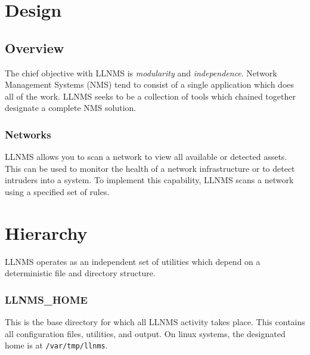 \documentclass[12pt]{report}
\begin{document}
\section*{Design}

\subsection*{Overview}
The chief objective with LLNMS is \emph{modularity} and
\emph{independence}.  Network Management Systems (NMS) tend
to consist of a single application which does all of the work.  
LLNMS seeks to be a collection of tools which chained together 
designate a complete NMS solution. 


\subsubsection*{Networks}

LLNMS allows you to scan a network to view all available or detected assets.  This 
can be used to monitor the health of a network infrastructure or to detect intruders into
a system.  To implement this capability, LLNMS scans a network using a specified set of 
rules.  

\section*{Hierarchy}

LLNMS operates as an independent set of utilities which depend on 
a deterministic file and directory structure. 

\subsubsection*{LLNMS\_HOME}
This is the base directory for which all LLNMS activity takes place.  This
contains all configuration files, utilities, and output.  On linux systems, 
the designated home is at \texttt{/var/tmp/llnms}. 
\end{document}

